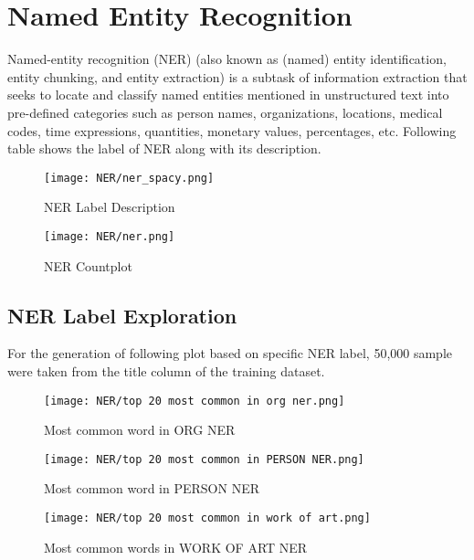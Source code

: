 \section{Named Entity Recognition}
Named-entity recognition (NER) (also known as (named) entity identification, entity chunking, and entity extraction) is a subtask of information extraction that seeks to locate and classify named entities mentioned in unstructured text into pre-defined categories such as person names, organizations, locations, medical codes, time expressions, quantities, monetary values, percentages, etc. Following table shows the label of NER along with its description.


\begin{figure}[H]
    \centering
    \texttt{[image: NER/ner\_spacy.png]}
    \caption{NER Label Description}
    \label{fig:NER Label Description}
\end{figure}

\begin{figure}[H]
    \centering
    \texttt{[image: NER/ner.png]}
    \caption{NER Countplot}
    \label{fig:NER Countplot}
\end{figure}

\subsection{NER Label Exploration}
For the generation of following plot based on specific NER label, 50,000 sample were taken from the title column of the training dataset.

\begin{figure}[H]
    \centering
    \texttt{[image: NER/top 20 most common in org ner.png]}
    \caption{Most common word in ORG NER}
    \label{fig:Most common word in ORG NER}
\end{figure}

\begin{figure}[H]
    \centering
    \texttt{[image: NER/top 20 most common in PERSON NER.png]}
    \caption{Most common word in PERSON NER}
    \label{fig:Most common word in PERSON NER}
\end{figure}

\begin{figure}[H]
    \centering
    \texttt{[image: NER/top 20 most common in work of art.png]}
    \caption{Most common words in WORK OF ART NER}
    \label{fig:Most common words in WORK OF ART NER}
\end{figure}

